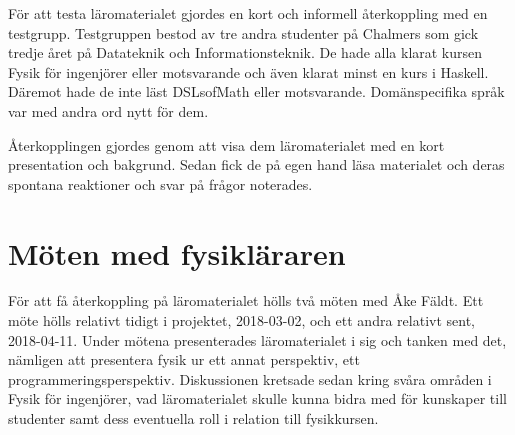 För att testa läromaterialet gjordes en kort och informell återkoppling med
en testgrupp. Testgruppen bestod av tre andra studenter på Chalmers som gick
tredje året på Datateknik och Informationsteknik. De hade alla klarat kursen Fysik för
ingenjörer eller motsvarande och även klarat minst en kurs i Haskell.
Däremot hade de inte läst DSLsofMath eller motsvarande. Domänspecifika språk var
med andra ord nytt för dem.

Återkopplingen gjordes genom att visa dem läromaterialet med en kort
presentation och bakgrund. Sedan fick de på egen hand läsa materialet och deras
spontana reaktioner och svar på frågor noterades.

\section{Möten med fysikläraren}

För att få återkoppling på läromaterialet hölls två möten med Åke Fäldt. Ett möte hölls relativt
tidigt i projektet, 2018-03-02, och ett andra relativt sent, 2018-04-11.
Under mötena presenterades läromaterialet i sig och tanken med det, nämligen att
presentera fysik ur ett annat perspektiv, ett
programmeringsperspektiv. Diskussionen kretsade sedan kring svåra områden i Fysik för
ingenjörer, vad läromaterialet skulle kunna
bidra med för kunskaper till studenter samt dess eventuella roll i relation till
fysikkursen.
